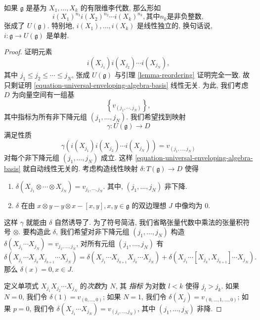 \begin{theorem}
  \label{theorem-Poincare-Birkhoff-Witt}
  如果 \( \mathfrak{g} \) 是基为 \( X_1, \ldots, X_k \) 的有限维李代数,
  那么形如
  \[
    i(X_1)^{n_1}i(X_2)^{n_2}\cdots i(X_k)^{n_k}, \text{其中} n_k
    \text{是非负整数},
  \]
  张成了 \( U(\mathfrak{g}) \). 特别地, \( i(X_1), \ldots, i(X_k) \)
  是线性独立的, 换句话说, \( i: \mathfrak{g} \to U(\mathfrak{g}) \) 是单射.
\end{theorem}
\begin{proof}
  证明元素
  \begin{equation}
    i(X_{j_1})i(X_{j_2}) \cdots
    i(X_{j_N}),\label{equation-universal-enveloping-algebra-basis}
  \end{equation}
  其中 \( j_1 \leq j_2 \leq \cdots \leq j_N \), 张成 \( U(\mathfrak{g}) \)
  与引理 \ref{lemma-reordering} 证明完全一致. 故只剩证明
  \eqref{equation-universal-enveloping-algebra-basis} 线性无关.
  为此, 我们考虑 \( D \) 为向量空间有一组基
  \[
    \left\lbrace v_{(j_1, \cdots, j_N)} \right\rbrace,
  \]
  其中指标为所有非下降元组 \( (j_1, \ldots, j_N) \).
  我们希望找到映射
  \[
    \gamma: U(\mathfrak{g}) \to D
  \]
  满足性质
  \[
    \gamma(i(X_{j_1}) i(X_{j_2}) \cdots i(X_{j_N})) = v_{(j_1,\ldots, j_N)}
  \]
  对每个非下降元组 \( (j_1, \ldots, j_N) \) 成立. 这样
  \eqref{equation-universal-enveloping-algebra-basis} 就自动线性无关的.
  考虑构造线性映射 \( \delta: T(\mathfrak{g}) \to D \) 使得
  \begin{enumerate}
    \item \( \delta(X_{j_1} \otimes \cdots \otimes X_{j_N}) = v_{j_1,\cdots,
      j_N} \).
    其中, \( (j_1, \ldots, j_N) \) 非下降.
    \item  \( \delta \) 在由 \( x \otimes y - y \otimes x - [x, y], x, y \in \mathfrak{g} \)
      的双边理想 \( J \) 中像均为 \( 0 \).
  \end{enumerate}
  这样 \( \gamma \) 就能由 \( \delta \) 自然诱导了. 为了符号简洁,
  我们省略张量代数中乘法的张量积符号 \( \otimes \).
  要构造此 \( \delta \), 我们希望对非下降元组 \( (j_1, \ldots, j_N) \) 构造 \(
  \delta(X_{j_1} \cdots X_{j_N}) = v_{j_1,\ldots, j_N} \), 对所有元组 \( (j_1,
  \ldots, j_N) \) 有
  \[
    \delta(X_{j_1}\cdots X_{j_k} X_{j_{k + 1}} \cdots X_{j_N} ) = \delta(X_{j_1}
    \cdots X_{j_{k + 1}} X_{j_k} \cdots X_{j_N}) + \delta(X_{j_1}\cdots
    [X_{j_k}, X_{j_{k + 1}}] \cdots X_{j_N}).
  \]
  那么 \( \delta(x) = 0, x \in J \).

  定义单项式 \( X_{j_1} X_{j_2} \cdots X_{j_N} \) 的\emph{次数}为 \( N \), 其
  \emph{指标} 为对数 \( l < k \) 使得 \( j_l > j_k \).   如果 \( N = 0 \),
  我们令 \( \delta(1) = v_{(0,\ldots, 0)} \); 如果 \( N = 1 \), 我们令 \(
  \delta(X_j) = v_{(0,\ldots, 1, \ldots, 0)} \); 如果 \( p = 0 \), 我们令 \(
  \delta(X_{j_1}\cdots X_{j_N}) = v_{(j_1,\ldots, j_N)} \), 其中 \( (j_1,
  \ldots, j_N) \) 非降.


\end{proof}
